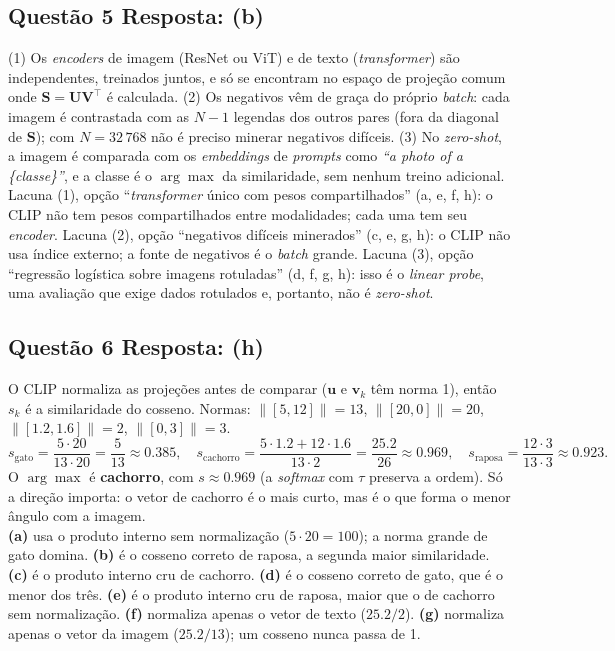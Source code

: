 \documentclass[11pt,a4paper]{article}
\begin{document}
\subsection*{Questão 5 \textemdash{} Resposta: (b)}
(1) Os \textit{encoders} de imagem (ResNet ou ViT) e de texto (\textit{transformer}) são independentes, treinados juntos, e só se encontram no espaço de projeção comum onde $\mathbf{S} = \mathbf{U}\mathbf{V}^\top$ é calculada. (2) Os negativos vêm de graça do próprio \textit{batch}: cada imagem é contrastada com as $N - 1$ legendas dos outros pares (fora da diagonal de $\mathbf{S}$); com $N = 32\,768$ não é preciso minerar negativos difíceis. (3) No \textit{zero-shot}, a imagem é comparada com os \textit{embeddings} de \textit{prompts} como \textit{``a photo of a \{classe\}''}, e a classe é o $\arg\max$ da similaridade, sem nenhum treino adicional.\\
Lacuna (1), opção ``\textit{transformer} único com pesos compartilhados'' (a, e, f, h): o CLIP não tem pesos compartilhados entre modalidades; cada uma tem seu \textit{encoder}.
Lacuna (2), opção ``negativos difíceis minerados'' (c, e, g, h): o CLIP não usa índice externo; a fonte de negativos é o \textit{batch} grande.
Lacuna (3), opção ``regressão logística sobre imagens rotuladas'' (d, f, g, h): isso é o \textit{linear probe}, uma avaliação que exige dados rotulados e, portanto, não é \textit{zero-shot}.

\subsection*{Questão 6 \textemdash{} Resposta: (h)}
O CLIP normaliza as projeções antes de comparar ($\mathbf{u}$ e $\mathbf{v}_k$ têm norma 1), então $s_k$ é a similaridade do cosseno. Normas: $\|[5, 12]\| = 13$, $\|[20, 0]\| = 20$, $\|[1.2, 1.6]\| = 2$, $\|[0, 3]\| = 3$.
\[
s_\text{gato} = \frac{5 \cdot 20}{13 \cdot 20} = \frac{5}{13} \approx 0.385,
\quad
s_\text{cachorro} = \frac{5 \cdot 1.2 + 12 \cdot 1.6}{13 \cdot 2} = \frac{25.2}{26} \approx 0.969,
\quad
s_\text{raposa} = \frac{12 \cdot 3}{13 \cdot 3} \approx 0.923.
\]
O $\arg\max$ é \textbf{cachorro}, com $s \approx 0.969$ (a \textit{softmax} com $\tau$ preserva a ordem). Só a direção importa: o vetor de cachorro é o mais curto, mas é o que forma o menor ângulo com a imagem.\\
\textbf{(a)} usa o produto interno sem normalização ($5 \cdot 20 = 100$); a norma grande de gato domina.
\textbf{(b)} é o cosseno correto de raposa, a segunda maior similaridade.
\textbf{(c)} é o produto interno cru de cachorro.
\textbf{(d)} é o cosseno correto de gato, que é o menor dos três.
\textbf{(e)} é o produto interno cru de raposa, maior que o de cachorro sem normalização.
\textbf{(f)} normaliza apenas o vetor de texto ($25.2 / 2$).
\textbf{(g)} normaliza apenas o vetor da imagem ($25.2 / 13$); um cosseno nunca passa de 1.
\end{document}
